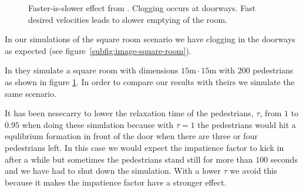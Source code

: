 \begin{figure}[ht]
    \centering
    \caption[Faster-is-slower effect from \cite{helbing00}]{Faster-is-slower 
    effect from \cite{helbing00}.  Clogging 
    occurs at doorways.  Fast desired 
    velocities leads to slower emptying of the room.}
    \label{fig:LtNFasterIsSlower}
\end{figure}

In our simulations of the square room scenario we have clogging in the 
doorways as expected (see figure~\ref{subfig:image-square-room}). 

In \cite{helbing00} they simulate a square room with dimensions 
$15\text{m} \cdot 15\text{m}$ with $200$ pedestrians as shown in 
figure \ref{fig:LtNFasterIsSlower}. In order to compare our results 
with theirs we simulate the same scenario.

It has been nesecarry to lower the relaxation time of the pedestrians, 
$\tau$, from $1$ to $0.95$ when doing these simulation because 
with $\tau = 1$ the pedestrians would hit a equlibrium formation 
in front of the door when there are three or four pedestrians left. 
In this case we would expect the impatience factor to kick in after 
a while but sometimes the pedestrians stand still for more than $100$ 
seconds and we have had to shut down the simulation. With a lower $\tau$ 
we avoid this because it makes the impatience factor have a stronger effect. 

